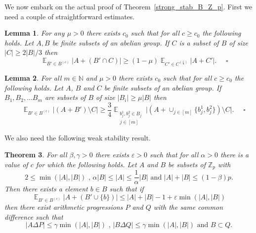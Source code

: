 \documentclass[12pt,reqno]{amsart}
\DeclareMathOperator*{\E}{\mathbb{E}}
\newtheorem{theorem}{Theorem}
\newtheorem{lemma}[theorem]{Lemma}
\theoremstyle{definition}
\renewcommand\leq{\leqslant}
\renewcommand\geq{\geqslant}
\begin{document}
\vspace{5pt}
We now embark on the actual proof of Theorem~\ref{strong_stab_B_Z_p}. First we
need a couple of straightforward estimates.

\begin{lemma}\label{change_c}
  For any $\mu>0$ there exists $c_0$ such that for all $c\geq c_0$ the following holds. Let $A,B$ be finite subsets of an abelian group. If $C$ is a subset of $B$ of size $|C|\geq 2|B|/3$ then
  $$\ \ \ \ \ \ \ \E_{B' \in B^{(c)}}|A+(B'\cap C)|\geq (1-\mu)\E_{C'\in C^{(\frac{c}{2})}}|A+C'|.
  \ \ \ \ \ \ \square$$
\end{lemma}
\begin{lemma}\label{change_c_again}
For all $m\in \mathbb{N}$ and $\mu>0$ there exists $c_0$ such that for all $c\geq c_0$ the following holds. Let $A$, $B$ and $C$ be finite subsets of an abelian group. If $B_1, B_2, \hdots B_m$ are subsets of $B$ of size $|B_i|\geq \mu |B|$ then
$$\ \ \ \ \ \ \E_{B' \in B^{(c)}}\bigg|(A+B')
\setminus C\bigg| \geq \frac{3}{4}\E_{\substack{ b^1_{j}, b_j^2 \in B_{j} \\ j \in [m] }}\bigg|(A+ \cup_{j \in [m]} \{b_{j}^1, b_{j}^2\})\setminus C\bigg|. \ \ \ \ \ \ \square  $$
\end{lemma}

\vspace{5pt}

We also need the following weak stability result.

\begin{theorem}\label{weak_stab_Zp}
  For all $\beta, \gamma >0$ there exists $\varepsilon>0$ such that for all $\alpha>0$ there is a
  value of $c$ for which the following holds. Let $A$ and $B$ be subsets of $\mathbb{Z}_p$
  with
\begin{equation}\label{eq22.-2}
    2\leq \min(|A|,|B|) \text{ , } \alpha |B| \leq |A| \leq \frac{1}{\alpha}|B| \text{ and } |A|+|B| \leq (1-\beta)p.
\end{equation}
Then there exists a element $b \in B$ such that if
\begin{equation}\label{eq22.-1}
    \E_{B'\in B^{(c)}}\bigg|A+(B'\cup \{b\})\bigg| \leq |A|+|B|-1 + \varepsilon \min(|A|,|B|)
\end{equation}
then there exist arithmetic progressions $P$ and $Q$ with the same common difference such that  $$|A\Delta P| \leq \gamma \min(|A|,|B|) \text{ , } |B\Delta Q| \leq \gamma \min(|A|,|B|) \text{ and } B \subset Q.$$
\end{theorem}
\end{document}
